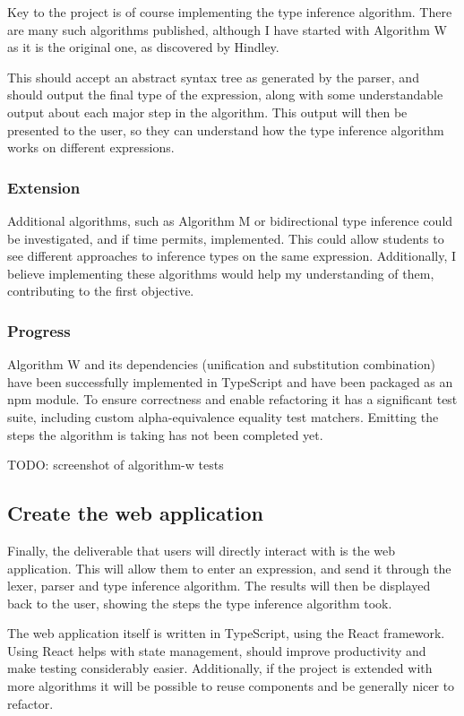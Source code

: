 \documentclass[12pt]{article}
\begin{document}
Key to the project is of course implementing the type inference algorithm. There are many such algorithms published, although I have started with Algorithm W as it is the original one, as discovered by Hindley.

This should accept an abstract syntax tree as generated by the parser, and should output the final type of the expression, along with some understandable output about each major step in the algorithm. This output will then be presented to the user, so they can understand how the type inference algorithm works on different expressions.

\subsubsection{Extension}

Additional algorithms, such as Algorithm M or bidirectional type inference could be investigated, and if time permits, implemented. This could allow students to see different approaches to inference types on the same expression. Additionally, I believe implementing these algorithms would help my understanding of them, contributing to the first objective.

\subsubsection{Progress}

Algorithm W and its dependencies (unification and substitution combination) have been successfully implemented in TypeScript and have been packaged as an npm module. To ensure correctness and enable refactoring it has a significant test suite, including custom alpha-equivalence equality test matchers. Emitting the steps the algorithm is taking has not been completed yet.

TODO: screenshot of algorithm-w tests

\subsection{Create the web application}

Finally, the deliverable that users will directly interact with is the web application. This will allow them to enter an expression, and send it through the lexer, parser and type inference algorithm. The results will then be displayed back to the user, showing the steps the type inference algorithm took.

The web application itself is written in TypeScript, using the React framework. Using React helps with state management, should improve productivity and make testing considerably easier. Additionally, if the project is extended with more algorithms it will be possible to reuse components and be generally nicer to refactor.
\end{document}
